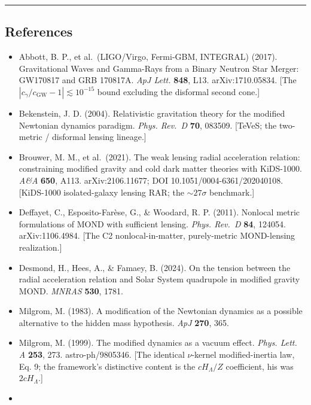 \documentclass[
]{article}
\providecommand{\tightlist}{%
  \setlength{\itemsep}{0pt}\setlength{\parskip}{0pt}}
\begin{document}
\begin{center}\rule{0.5\linewidth}{0.5pt}\end{center}

\subsection{References}\label{references}

\begin{itemize}
\tightlist
\item
  Abbott, B. P., et al.~(LIGO/Virgo, Fermi-GBM, INTEGRAL) (2017).
  Gravitational Waves and Gamma-Rays from a Binary Neutron Star Merger:
  GW170817 and GRB 170817A. \emph{ApJ Lett.} \textbf{848}, L13.
  arXiv:1710.05834. {[}The \(|c_\gamma/c_\mathrm{GW}-1|\lesssim10^{-15}\)
  bound excluding the disformal second cone.{]}
\item
  Bekenstein, J. D. (2004). Relativistic gravitation theory for the
  modified Newtonian dynamics paradigm. \emph{Phys. Rev.~D} \textbf{70},
  083509. {[}TeVeS; the two-metric / disformal lensing lineage.{]}
\item
  Brouwer, M. M., et al.~(2021). The weak lensing radial acceleration
  relation: constraining modified gravity and cold dark matter theories
  with KiDS-1000. \emph{A\&A} \textbf{650}, A113. arXiv:2106.11677; DOI
  10.1051/0004-6361/202040108. {[}KiDS-1000 isolated-galaxy lensing RAR;
  the \(\sim27\sigma\) benchmark.{]}
\item
  Deffayet, C., Esposito-Farèse, G., \& Woodard, R. P. (2011). Nonlocal
  metric formulations of MOND with sufficient lensing. \emph{Phys.
  Rev.~D} \textbf{84}, 124054. arXiv:1106.4984. {[}The C2
  nonlocal-in-matter, purely-metric MOND-lensing realization.{]}
\item
  Desmond, H., Hees, A., \& Famaey, B. (2024). On the tension between
  the radial acceleration relation and Solar System quadrupole in
  modified gravity MOND. \emph{MNRAS} \textbf{530}, 1781.
\item
  Milgrom, M. (1983). A modification of the Newtonian dynamics as a
  possible alternative to the hidden mass hypothesis. \emph{ApJ}
  \textbf{270}, 365.
\item
  Milgrom, M. (1999). The modified dynamics as a vacuum effect.
  \emph{Phys. Lett. A} \textbf{253}, 273. astro-ph/9805346. {[}The
  identical \(\nu\)-kernel modified-inertia law, Eq. 9; the framework's
  distinctive content is the \(cH_\Lambda/Z\) coefficient, his was
  \(2cH_\Lambda\).{]}
\item

\end{itemize}
\end{document}
